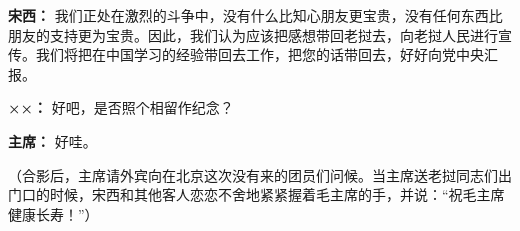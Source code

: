 \begin{list}{}
\item[\textbf{宋西：}] 我们正处在激烈的斗争中，没有什么比知心朋友更宝贵，没有任何东西比朋友的支持更为宝贵。因此，我们认为应该把感想带回老挝去，向老挝人民进行宣传。我们将把在中国学习的经验带回去工作，把您的话带回去，好好向党中央汇报。

\item[\textbf{××：}] 好吧，是否照个相留作纪念？

\item[\textbf{主席：}] 好哇。

（合影后，主席请外宾向在北京这次没有来的团员们问候。当主席送老挝同志们出门口的时候，宋西和其他客人恋恋不舍地紧紧握着毛主席的手，并说：“祝毛主席健康长寿！”）
\end{list}

